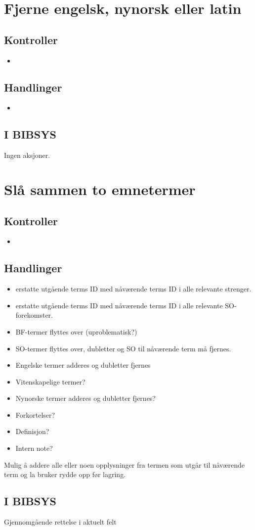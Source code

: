 \documentclass[a4paper,10pt,norsk]{article}
\begin{document}
\section{Fjerne engelsk, nynorsk eller latin}
\subsection*{Kontroller}
\begin{itemize}
\item 
\end{itemize}
\subsection*{Handlinger}
\begin{itemize}
\item 
\end{itemize}
\subsection*{I BIBSYS}
Ingen aksjoner.

\section{Slå sammen to emnetermer}
\subsection*{Kontroller}
\begin{itemize}
\item 
\end{itemize}
\subsection*{Handlinger}
\begin{itemize}
\item erstatte utgående terms ID med nåværende terms ID i alle relevante strenger.
\item erstatte utgående terms ID med nåværende terms ID i alle relevante SO-forekomster.
\item BF-termer flyttes over (uproblematisk?)
\item SO-termer flyttes over, dubletter og SO til nåværende term må fjernes.
\item Engelske termer adderes og dubletter fjernes
\item Vitenskapelige termer?
\item Nynorske termer adderes og dubletter fjernes?
\item Forkortelser?
\item Definisjon?
\item Intern note?
\end{itemize}
Mulig å addere alle eller noen opplysninger fra termen som utgår til nåværende term og la bruker rydde opp før lagring.
\subsection*{I BIBSYS}
Gjennomgående rettelse i aktuelt felt
\end{document}
